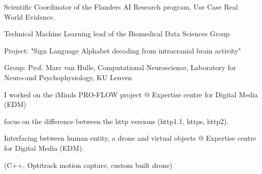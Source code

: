 
\begin{cventries}
{\begin{cvitems}\item Scientific Coordinator of the Flanders AI Research program, Use Case Real World Evidence.\item Technical Machine Learning lead of the Biomedical Data Sciences Group\end{cvitems}
}

{\begin{cvitems}\item Project: "Sign Language Alphabet decoding from intracranial brain activity"\item Group: Prof. Marc van Hulle, Computational Neuroscience, Laboratory for Neuro-and Psychophysiology, KU Leuven\end{cvitems}
}

{\begin{cvitems}\item I worked on the iMinds PRO-FLOW project @ Expertise centre for Digital Media (EDM)\item focus on the difference between the http versions (http1.1, https, http2).\end{cvitems}
}

{\begin{cvitems}\item Interfacing between human entity, a drone and virtual objects @ Expertise centre for Digital Media (EDM). \item (C++, Optitrack motion capture, custom built drone)\end{cvitems}
}


\end{cventries}
